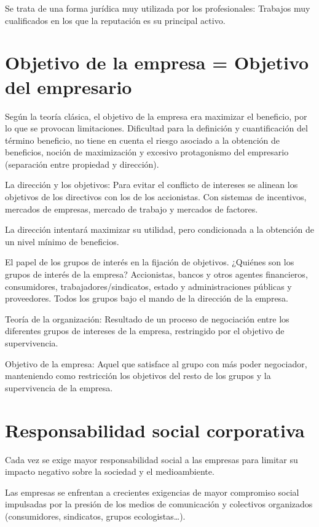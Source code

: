 \documentclass[12pt, twoside, openright]{report} %
\begin{document}
Se trata de una forma jurídica muy utilizada por los profesionales: Trabajos muy cualificados en los que la
reputación es su principal activo.

\section{Objetivo de la empresa = Objetivo del empresario}

Según la teoría clásica, el objetivo de la empresa era maximizar el beneficio, por lo que se provocan
limitaciones. Dificultad para la definición y cuantificación del término beneficio, no tiene en cuenta el riesgo
asociado a la obtención de beneficios, noción de maximización y excesivo protagonismo del empresario
(separación entre propiedad y dirección).

La dirección y los objetivos: Para evitar el conflicto de intereses se alinean los objetivos de los directivos con
los de los accionistas. Con sistemas de incentivos, mercados de empresas, mercado de trabajo y mercados
de factores.

La dirección intentará maximizar su utilidad, pero condicionada a la obtención de un nivel mínimo de
beneficios.

El papel de los grupos de interés en la fijación de objetivos. ¿Quiénes son los grupos de interés de la
empresa? Accionistas, bancos y otros agentes financieros, consumidores, trabajadores/sindicatos, estado y
administraciones públicas y proveedores. Todos los grupos bajo el mando de la dirección de la empresa.

Teoría de la organización: Resultado de un proceso de negociación entre los diferentes grupos de intereses
de la empresa, restringido por el objetivo de supervivencia.

Objetivo de la empresa: Aquel que satisface al grupo con más poder negociador, manteniendo como
restricción los objetivos del resto de los grupos y la supervivencia de la empresa.

\section{Responsabilidad social corporativa}

Cada vez se exige mayor responsabilidad social a las empresas para limitar su impacto negativo sobre la
sociedad y el medioambiente.

Las empresas se enfrentan a crecientes exigencias de mayor compromiso social impulsadas por la presión de
los medios de comunicación y colectivos organizados (consumidores, sindicatos, grupos ecologistas…).
\end{document}
